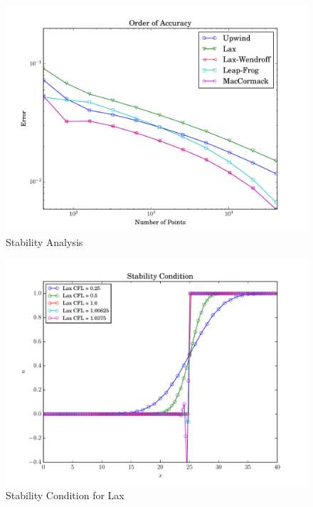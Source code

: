 \documentclass[letterpaper,12pt,]{article}
\begin{document}
\begin{figure}
    \centering
    \includegraphics[width = \textwidth]{./Figures/q3}
    \caption{Stability Analysis}
    \label{fig:q2}
\end{figure}

\begin{figure}
    \centering
    \includegraphics[width = \textwidth]{./Figures/q4_1}
    \caption{Stability Condition for Lax}
    \label{fig:q2}
\end{figure}
\end{document}
